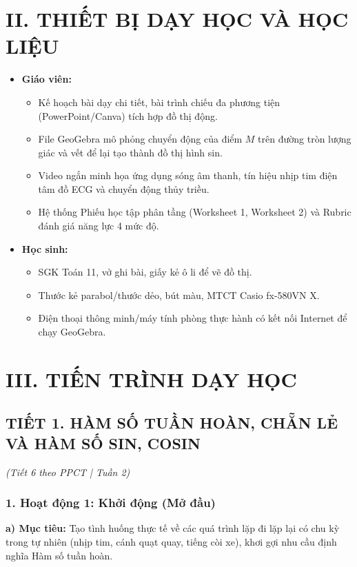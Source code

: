 \documentclass[12pt, a4paper]{article}
\begin{document}
\section*{II. THIẾT BỊ DẠY HỌC VÀ HỌC LIỆU}

\begin{itemize}[leftmargin=1.2cm]
    \item \textbf{Giáo viên:}
    \begin{itemize}[leftmargin=0.6cm]
        \item Kế hoạch bài dạy chi tiết, bài trình chiếu đa phương tiện (PowerPoint/Canva) tích hợp đồ thị động.
        \item File GeoGebra mô phỏng chuyển động của điểm $M$ trên đường tròn lượng giác và vết để lại tạo thành đồ thị hình sin.
        \item Video ngắn minh họa ứng dụng sóng âm thanh, tín hiệu nhịp tim điện tâm đồ ECG và chuyển động thủy triều.
        \item Hệ thống Phiếu học tập phân tầng (Worksheet 1, Worksheet 2) và Rubric đánh giá năng lực 4 mức độ.
    \end{itemize}
    \item \textbf{Học sinh:}
    \begin{itemize}[leftmargin=0.6cm]
        \item SGK Toán 11, vở ghi bài, giấy kẻ ô li để vẽ đồ thị.
        \item Thước kẻ parabol/thước dẻo, bút màu, MTCT Casio fx-580VN X.
        \item Điện thoại thông minh/máy tính phòng thực hành có kết nối Internet để chạy GeoGebra.
    \end{itemize}
\end{itemize}

\section*{III. TIẾN TRÌNH DẠY HỌC}

\subsection*{TIẾT 1. HÀM SỐ TUẦN HOÀN, CHẴN LẺ VÀ HÀM SỐ SIN, COSIN}
\textit{(Tiết 6 theo PPCT | Tuần 2)}

\subsubsection*{1. Hoạt động 1: Khởi động (Mở đầu)}
\textbf{a) Mục tiêu:} Tạo tình huống thực tế về các quá trình lặp đi lặp lại có chu kỳ trong tự nhiên (nhịp tim, cánh quạt quay, tiếng còi xe), khơi gợi nhu cầu định nghĩa Hàm số tuần hoàn.
\end{document}
